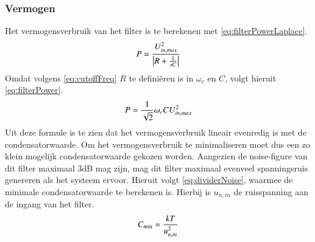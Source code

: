 \subsubsection{Vermogen}
Het vermogensverbruik van het filter is te berekenen met \autoref{eq:filterPowerLaplace}.
\begin{equation} \label{eq:filterPowerLaplace}
    P = \frac{U_{in,max}^2}{\left|R + \frac{1}{sC}\right|}
    \tagaddtext{[\si{\watt}]}
\end{equation}
Omdat volgens \autoref{eq:cutoffFreq} $R$ te definiëren is in $\omega_c$ en $C$, volgt hieruit \autoref{eq:filterPower}.
\begin{equation} \label{eq:filterPower}
    P = \frac{1}{\sqrt{2}}\omega_cCU_{in,max}^2
    \tagaddtext{[\si{\watt}]}
\end{equation}
Uit deze formule is te zien dat het vermogensverbruik lineair evenredig is met de condensatorwaarde. Om het vermogensverbruik te minimaliseren moet dus een zo klein mogelijk condensatorwaarde gekozen worden. Aangezien de noise-figure van dit filter maximaal 3dB mag zijn, mag dit filter maximaal evenveel spanningsruis genereren als het systeem ervoor. Hieruit volgt \autoref{eq:dividerNoise}, waarmee de minimale condensatorwaarde te berekenen is. Hierbij is $u_{n,in}$ de ruisspanning aan de ingang van het filter.
\begin{equation} \label{eq:filterCapMin}
    C_{min} = \frac{kT}{u_{n,in}^2}
    \tagaddtext{[\si{\farad}]}
\end{equation}